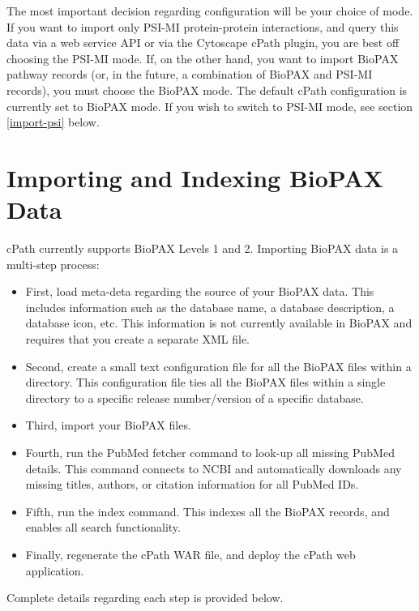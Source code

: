 \documentclass[letterpaper,12pt]{article}
\begin{document}
The most important decision regarding configuration will be your choice of mode.  If you want to import only PSI-MI protein-protein interactions, and query this data via a web service API or via the Cytoscape cPath plugin, you are best off choosing the PSI-MI mode.  If, on the other hand, you want to import BioPAX pathway records (or, in the future, a combination of BioPAX and PSI-MI records), you must choose the BioPAX mode.  The default cPath configuration is currently set to BioPAX mode.  If you wish to switch to PSI-MI mode, see section \ref{import-psi} below.

\section{Importing and Indexing BioPAX Data}

cPath currently supports BioPAX Levels 1 and 2.  Importing BioPAX data is a multi-step process: 

\begin{itemize}
\item First, load meta-deta regarding the source of your BioPAX data.  This includes information such as the database name, a database description, a database icon, etc.  This information is not currently available in BioPAX and requires that you create a separate XML file.

\item Second, create a small text configuration file for all the BioPAX files within a directory.  This configuration file ties all the BioPAX files within a single directory to a specific release number/version of a specific database.

\item Third, import your BioPAX files.

\item Fourth, run the PubMed fetcher command to look-up all missing PubMed details.  This command connects to NCBI and automatically downloads any missing titles, authors, or citation information for all PubMed IDs.

\item Fifth, run the index command.  This indexes all the BioPAX records, and enables all search functionality.

\item Finally, regenerate the cPath WAR file, and deploy the cPath web application.

\end{itemize}

Complete details regarding each step is provided below.
\end{document}
